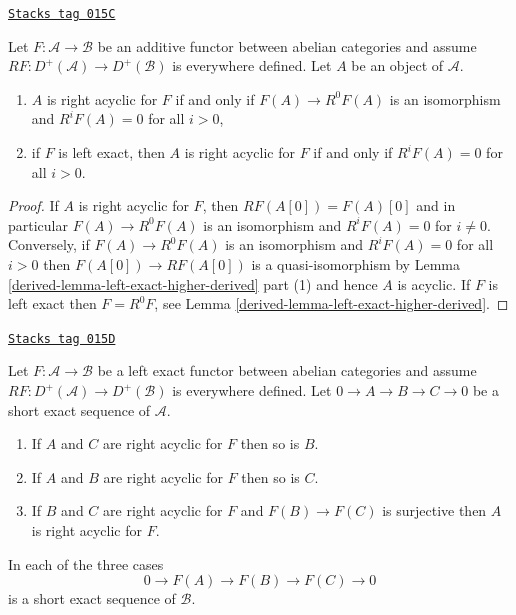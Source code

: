 \begin{lemma}[F acyclic]
\label{derived-lemma-F-acyclic}
\href{https://stacks.math.columbia.edu/tag/015C}{\texttt{Stacks tag 015C}}

Let $F : \mathcal{A} \to \mathcal{B}$ be an additive functor
between abelian categories and assume
$RF : D^{+}(\mathcal{A}) \to D^{+}(\mathcal{B})$ is everywhere
defined. Let $A$ be an object of $\mathcal{A}$.
\begin{enumerate}
\item $A$ is right acyclic for $F$ if and only if
$F(A) \to R^0F(A)$ is an isomorphism and $R^iF(A) = 0$ for all $i > 0$,
\item if $F$ is left exact, then $A$ is right acyclic for $F$
if and only if $R^iF(A) = 0$ for all $i > 0$.
\end{enumerate}
\end{lemma}

\begin{proof}

If $A$ is right acyclic for $F$, then $RF(A[0]) = F(A)[0]$ and in
particular $F(A) \to R^0F(A)$ is an isomorphism and
$R^iF(A) = 0$ for $i \not = 0$. Conversely, if $F(A) \to R^0F(A)$
is an isomorphism and $R^iF(A) = 0$ for all $i > 0$ then
$F(A[0]) \to RF(A[0])$ is a quasi-isomorphism by
Lemma \ref{derived-lemma-left-exact-higher-derived} part (1)
and hence $A$ is acyclic. If $F$ is left exact then $F = R^0F$, see
Lemma \ref{derived-lemma-left-exact-higher-derived}.
\end{proof}

\begin{lemma}
\label{derived-lemma-F-acyclic-ses}
\href{https://stacks.math.columbia.edu/tag/015D}{\texttt{Stacks tag 015D}}

Let $F : \mathcal{A} \to \mathcal{B}$ be a left exact functor
between abelian categories and assume
$RF : D^{+}(\mathcal{A}) \to D^{+}(\mathcal{B})$ is everywhere
defined. Let $0 \to A \to B \to C \to 0$ be a short exact sequence
of $\mathcal{A}$.
\begin{enumerate}
\item If $A$ and $C$ are right acyclic for $F$ then so is $B$.
\item If $A$ and $B$ are right acyclic for $F$ then so is $C$.
\item If $B$ and $C$ are right acyclic for $F$ and $F(B) \to F(C)$ is
surjective then $A$ is right acyclic for $F$.
\end{enumerate}
In each of the three cases
$$
0 \to F(A) \to F(B) \to F(C) \to 0
$$
is a short exact sequence of $\mathcal{B}$.
\end{lemma}

